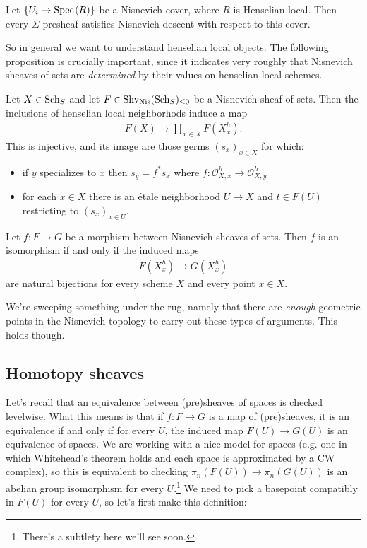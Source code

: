 \documentclass[11pt,openany]{book}
\begin{document}
\begin{proposition} Let $\left\{ U_i \to \text{Spec}\hspace{0.1em}(R) \right\}$ be a Nisnevich cover, where $R$ is Henselian local. Then every $\Sigma$-presheaf satisfies Nisnevich descent with respect to this cover.
\end{proposition}

So in general we want to understand henselian local objects. The following proposition is crucially important, since it indicates very roughly that Nisnevich sheaves of sets are \emph{determined} by their values on henselian local schemes.

\begin{proposition} Let $X\in\mathrm{Sch}_S$ and let $F\in \mathrm{Shv}_{\mathrm{Nis}}(\mathrm{Sch}_S)_{\le0}$ be a Nisnevich sheaf of sets. Then the inclusions of henselian local neighborhods induce a map
\begin{align*}
    F(X) \to \prod_{x\in X}F(X_x^h).
\end{align*}
This is injective, and its image are those germs $(s_x)_{x\in X}$ for which:
\begin{itemize}
    \item if $y$ specializes to $x$ then $s_y = f^\ast s_x$ where $f \colon \mathcal{O}_{X,x}^h \to \mathcal{O}_{X,y}^h$
    \item for each $x\in X$ there is an \'etale neighborhood $U \to X$ and $t\in F(U)$ restricting to $(s_x)_{x\in U}$.
\end{itemize}
\end{proposition}

\begin{corollary}\label{cor:morphism-nis-sheaves-of-sets-determined-by-henselian-local-schemes} 
Let $f \colon F \to G$ be a morphism between Nisnevich sheaves of sets. Then $f$ is an isomorphism if and only if the induced maps
\begin{align*}
    F(X_x^h) \to G(X_x^h)
\end{align*}
are natural bijections for every scheme $X$ and every point $x\in X$.
\end{corollary}

We're sweeping something under the rug, namely that there are \emph{enough} geometric points in the Nisnevich topology to carry out these types of arguments. This holds though.

\subsection{Homotopy sheaves}

Let's recall that an equivalence between (pre)sheaves of spaces is checked levelwise. What this means is that if $f \colon F \to G$ is a map of (pre)sheaves, it is an equivalence if and only if for every $U$, the induced map $F(U) \to G(U)$ is an equivalence of spaces. We are working with a nice model for spaces (e.g. one in which Whitehead's theorem holds and each space is approximated by a CW complex), so this is equivalent to checking $\pi_n(F(U)) \to \pi_n(G(U))$ is an abelian group isomorphism for every $U$.\footnote{There's a subtlety here we'll see soon.} We need to pick a basepoint compatibly in $F(U)$ for every $U$, so let's first make this definition:
\end{document}
